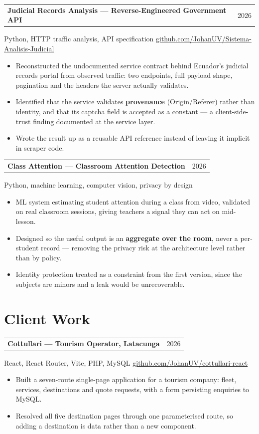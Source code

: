 \documentclass[10.5pt,a4paper]{article}
\makeatletter
\newcommand{\entry}[2]{%
  \begin{tabularx}{\linewidth}{@{}Xr@{}}
    \textbf{#1} & {\small\color{soft}#2}
  \end{tabularx}%
  \vspace{0.15em}
}
\newcommand{\subentry}[1]{{\small\color{muted}#1}\vspace{0.25em}}
\newenvironment{points}
  {\begin{itemize}[leftmargin=1.1em, itemsep=0.18em, topsep=0.25em, parsep=0pt, label=\textcolor{soft}{\footnotesize\textbullet}]}
  {\end{itemize}}
\makeatother
\begin{document}
\entry{Judicial Records Analysis --- Reverse-Engineered Government API}{2026}
\subentry{Python, HTTP traffic analysis, API specification \textbullet{} \href{https://github.com/JohanUV/Sistema-Analisis-Judicial}{github.com/JohanUV/Sistema-Analisis-Judicial}}
\begin{points}
  \item Reconstructed the undocumented service contract behind Ecuador's judicial records
        portal from observed traffic: two endpoints, full payload shape, pagination and the
        headers the server actually validates.
  \item Identified that the service validates \textbf{provenance} (Origin/Referer) rather than
        identity, and that its captcha field is accepted as a constant --- a client-side-trust
        finding documented at the service layer.
  \item Wrote the result up as a reusable API reference instead of leaving it implicit in
        scraper code.
\end{points}

\entry{Class Attention --- Classroom Attention Detection}{2026}
\subentry{Python, machine learning, computer vision, privacy by design}
\begin{points}
  \item ML system estimating student attention during a class from video, validated on real
        classroom sessions, giving teachers a signal they can act on mid-lesson.
  \item Designed so the useful output is an \textbf{aggregate over the room}, never a per-student
        record --- removing the privacy risk at the architecture level rather than by policy.
  \item Identity protection treated as a constraint from the first version, since the subjects
        are minors and a leak would be unrecoverable.
\end{points}

\section*{Client Work}

\entry{Cottullari --- Tourism Operator, Latacunga}{2026}
\subentry{React, React Router, Vite, PHP, MySQL \textbullet{} \href{https://github.com/JohanUV/cottullari-react}{github.com/JohanUV/cottullari-react}}
\begin{points}
  \item Built a seven-route single-page application for a tourism company: fleet, services,
        destinations and quote requests, with a form persisting enquiries to MySQL.
  \item Resolved all five destination pages through one parameterised route, so adding a
        destination is data rather than a new component.
\end{points}
\end{document}
